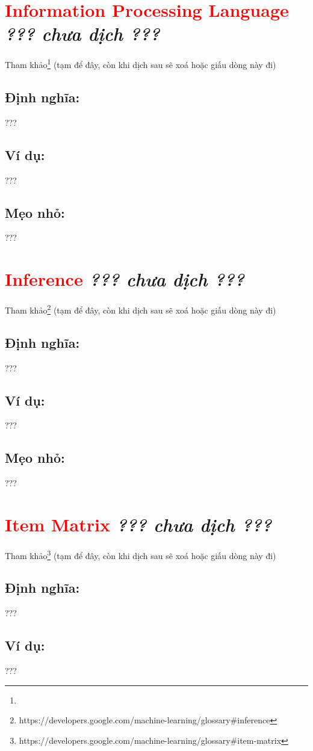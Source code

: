 \section*{\huge \textcolor{Red}{Information Processing Language}  \small \textit{??? chưa dịch ???} }
Tham khảo\footnote{} (tạm để đây, còn khi dịch sau sẽ xoá hoặc giấu dòng này đi)
\subsection*{Định nghĩa:}
???
\subsection*{Ví dụ:}
???
\subsection*{Mẹo nhỏ:}
???
\section*{\huge \textcolor{Red}{Inference}  \small \textit{??? chưa dịch ???} }
Tham khảo\footnote{https://developers.google.com/machine-learning/glossary\#inference} (tạm để đây, còn khi dịch sau sẽ xoá hoặc giấu dòng này đi)
\subsection*{Định nghĩa:}
???
\subsection*{Ví dụ:}
???
\subsection*{Mẹo nhỏ:}
???
\section*{\huge \textcolor{Red}{Item Matrix}  \small \textit{??? chưa dịch ???} }
Tham khảo\footnote{https://developers.google.com/machine-learning/glossary\#item-matrix} (tạm để đây, còn khi dịch sau sẽ xoá hoặc giấu dòng này đi)
\subsection*{Định nghĩa:}
???
\subsection*{Ví dụ:}
???
